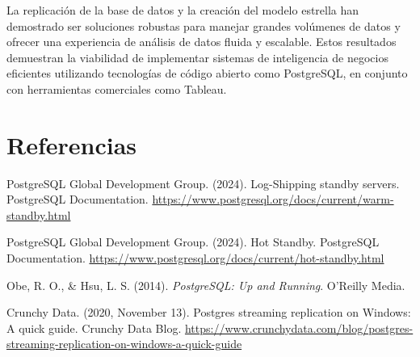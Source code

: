 \documentclass{article}
\begin{document}
La replicación de la base de datos y la creación del modelo estrella han demostrado ser soluciones robustas para manejar grandes volúmenes de datos y ofrecer una experiencia de análisis de datos fluida y escalable. Estos resultados demuestran la viabilidad de implementar sistemas de inteligencia de negocios eficientes utilizando tecnologías de código abierto como PostgreSQL, en conjunto con herramientas comerciales como Tableau.

\newpage
\section*{Referencias}

PostgreSQL Global Development Group. (2024). Log-Shipping standby servers. PostgreSQL Documentation. \url{https://www.postgresql.org/docs/current/warm-standby.html}

PostgreSQL Global Development Group. (2024). Hot Standby. PostgreSQL Documentation. \url{https://www.postgresql.org/docs/current/hot-standby.html}

Obe, R. O., \& Hsu, L. S. (2014). \textit{PostgreSQL: Up and Running}. O'Reilly Media.

Crunchy Data. (2020, November 13). Postgres streaming replication on Windows: A quick guide. Crunchy Data Blog. \url{https://www.crunchydata.com/blog/postgres-streaming-replication-on-windows-a-quick-guide}
\end{document}
